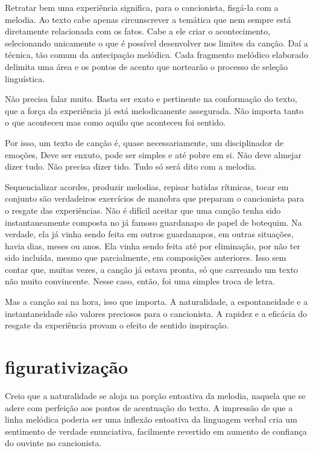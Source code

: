 Retratar bem uma experiência significa, para o cancionista, fisgá-la com
a melodia. Ao texto cabe apenas circunscrever a temática que nem sempre
está diretamente relacionada com os fatos. Cabe a ele criar o
acontecimento, selecionando unicamente o que é possível desenvolver nos
limites da canção. Daí a técnica, tão comum da antecipação melódica.
Cada fragmento melódico elaborado delimita uma área e os pontos de
acento que nortearão o processo de seleção linguística.

Não precisa falar muito. Basta ser exato e pertinente na conformação do
texto, que a força da experiência já está melodicamente assegurada. Não
importa tanto o que aconteceu mas como aquilo que aconteceu foi sentido.

Por isso, um texto de canção é, quase necessariamente, um disciplinador
de emoções, Deve ser enxuto, pode ser simples e até pobre em si. Não
deve almejar dizer tudo. Não precisa dizer tido. Tudo só será dito com a
melodia.

Sequencializar acordes, produzir melodias, repisar batidas rítmicas,
tocar em conjunto são verdadeiros exercícios de manobra que preparam o
cancionista para o resgate das experiências. Não é difícil aceitar que
uma canção tenha sido instantaneamente composta no já famoso guardanapo
de papel de botequim. Na verdade, ela já vinha sendo feita em outros
guardanapos, em outras situações, havia dias, meses ou anos. Ela vinha
sendo feita até por eliminação, por não ter sido incluída, mesmo que
parcialmente, em composições anteriores. Isso sem contar que, muitas
vezes, a canção já estava pronta, só que carreando um texto não muito
convincente. Nesse caso, então, foi uma simples troca de letra.

Mas a canção sai na hora, isso que importa. A naturalidade, a
espontaneidade e a instantaneidade são valores preciosos para o
cancionista. A rapidez e a eficácia do resgate da experiência provam o
efeito de sentido inspiração.

\section{figurativização}

Creio que a naturalidade se aloja na porção entoativa da melodia,
naquela que se adere com perfeição aos pontos de acentuação do texto. A
impressão de que a linha melódica poderia ser uma inflexão entoativa da
linguagem verbal cria um sentimento de verdade enunciativa, facilmente
revertido em aumento de confiança do ouvinte no cancionista.

